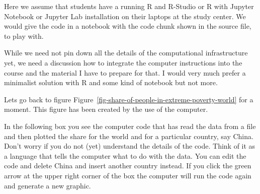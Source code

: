 \documentclass[
  letterpaper,
]{scrbook}
\begin{document}
\begin{tcolorbox}[enhanced jigsaw, toprule=.15mm, colbacktitle=quarto-callout-caution-color!10!white, breakable, coltitle=black, rightrule=.15mm, bottomtitle=1mm, bottomrule=.15mm, titlerule=0mm, title=\textcolor{quarto-callout-caution-color}{\faFire}\hspace{0.5em}{Comment for Seitwerk}, arc=.35mm, leftrule=.75mm, toptitle=1mm, left=2mm, opacityback=0, opacitybacktitle=0.6, colframe=quarto-callout-caution-color-frame, colback=white]
Here we assume that students have a running R and R-Studio or R with
Jupyter Notebook or Jupyter Lab installation on their laptops at the
study center. We would give the code in a notebook with the code chunk
shown in the source file, to play with.

While we need not pin down all the details of the computational
infrastructure yet, we need a discussion how to integrate the computer
instructions into the course and the material I have to prepare for
that. I would very much prefer a minimalist solution with R and some
kind of notebook but not more.
\end{tcolorbox}

Lets go back to figure
Figure~\ref{fig-share-of-people-in-extreme-poverty-world} for a moment.
This figure has been created by the use of the computer.

In the following box you see the computer code that has read the data
from a file and then plotted the share for the world and for a
particular country, say China. Don't worry if you do not (yet)
understand the details of the code. Think of it as a language that tells
the computer what to do with the data. You can edit the code and delete
China and insert another country instead. If you click the green arrow
at the upper right corner of the box the computer will run the code
again and generate a new graphic.
\end{document}
